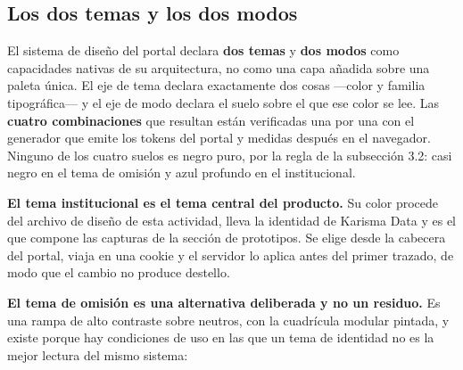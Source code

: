 \subsection{Los dos temas y los dos modos}

El sistema de diseño del portal declara \textbf{dos temas} y \textbf{dos modos} como capacidades
nativas de su arquitectura, no como una capa añadida sobre una paleta única. El eje de tema declara
exactamente dos cosas ---color y familia tipográfica--- y el eje de modo declara el suelo sobre el
que ese color se lee. Las \textbf{cuatro combinaciones} que resultan están verificadas una por una
con el generador que emite los tokens del portal y medidas después en el navegador. Ninguno de
los cuatro suelos es negro puro, por la regla de la subsección 3.2: casi negro en el tema de
omisión y azul profundo en el institucional.

\textbf{El tema institucional es el tema central del producto.} Su color procede del archivo de
diseño de esta actividad, lleva la identidad de Karisma Data y es el que compone las capturas de la
sección de prototipos. Se elige desde la cabecera del portal, viaja en una cookie y el servidor lo
aplica antes del primer trazado, de modo que el cambio no produce destello.

\textbf{El tema de omisión es una alternativa deliberada y no un residuo.} Es una rampa de alto
contraste sobre neutros, con la cuadrícula modular pintada, y existe porque hay condiciones de uso
en las que un tema de identidad no es la mejor lectura del mismo sistema:

\begin{uxlist}
\end{uxlist}

